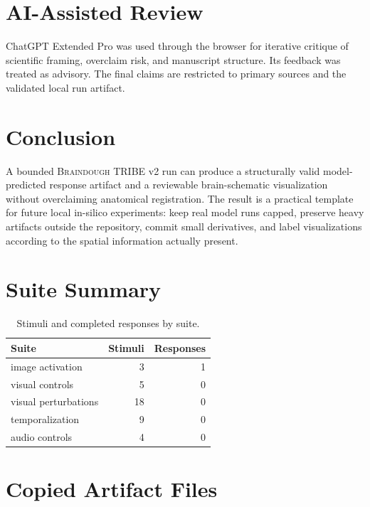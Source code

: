 \documentclass[11pt]{article}
\newcommand{\braindough}{\textsc{Braindough}}
\newcommand{\tribe}{TRIBE v2}
\begin{document}
\section{AI-Assisted Review}

ChatGPT Extended Pro was used through the browser for iterative critique of
scientific framing, overclaim risk, and manuscript structure. Its feedback was
treated as advisory. The final claims are restricted to primary sources and
the validated local run artifact.

\section{Conclusion}

A bounded \braindough{} \tribe{} run can produce a structurally valid
model-predicted response artifact and a reviewable brain-schematic
visualization without overclaiming anatomical registration. The result is a
practical template for future local in-silico experiments: keep real model runs
capped, preserve heavy artifacts outside the repository, commit small
derivatives, and label visualizations according to the spatial information
actually present.

\appendix

\section{Suite Summary}

\begin{table}[ht]
  \centering
  \caption{Stimuli and completed responses by suite.}
  \label{tab:suite-summary}
  \begin{tabular}{lrr}
    \toprule
    Suite & Stimuli & Responses \\
    \midrule
    image activation & 3 & 1 \\
    visual controls & 5 & 0 \\
    visual perturbations & 18 & 0 \\
    temporalization & 9 & 0 \\
    audio controls & 4 & 0 \\
    \bottomrule
  \end{tabular}
\end{table}

\section{Copied Artifact Files}
\end{document}
